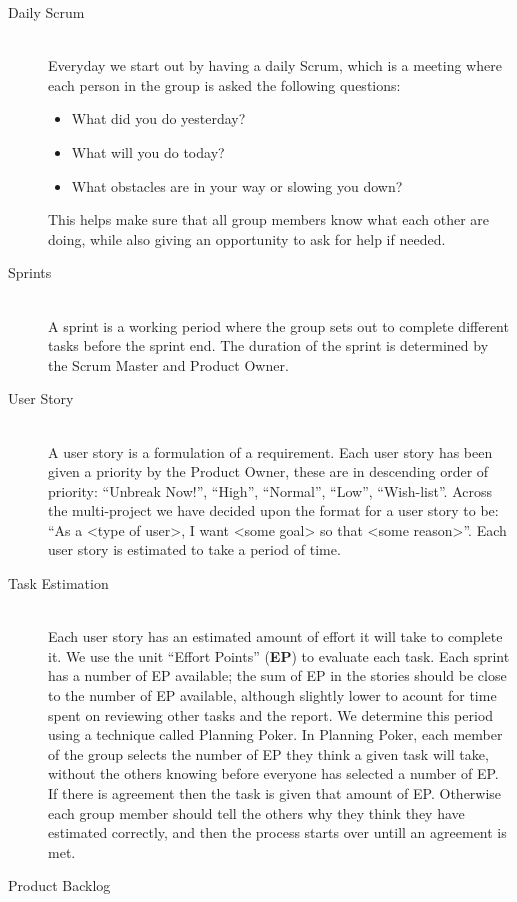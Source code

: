 \begin{description}
	\item[Daily Scrum] \hfill \\
	Everyday we start out by having a daily Scrum, which is a meeting where each person in the group is asked the following questions:
		\begin{itemize}
		    \item What did you do yesterday? 
			\item What will you do today?
			\item What obstacles are in your way or slowing you down?		
		\end{itemize}
		This helps make sure that all group members know what each other are doing, while also giving an opportunity to ask for help if needed.
	\item[Sprints] \hfill \\
	A sprint is a working period where the group sets out to complete different tasks before the sprint end. 
	The duration of the sprint is determined by the Scrum Master and Product Owner. 
	\item[User Story] \hfill \\
	A user story is a formulation of a requirement. 
	Each user story has been given a priority by the Product Owner, these are in descending order of priority: ``Unbreak Now!'', ``High'', ``Normal'', ``Low'', ``Wish-list''. 
	Across the multi-project we have decided upon the format for a user story to be: ``As a <type of user>, I want <some goal> so that <some reason>''.
	Each user story is estimated to take a period of time.
	\item[Task Estimation] \hfill \\
	Each user story has an estimated amount of effort it will take to complete it. 
	We use the unit ``Effort Points'' (\textbf{EP}) to evaluate each task.
	Each sprint has a number of EP available; the sum of EP in the stories should be close to the number of EP available, although slightly lower to acount for time spent on reviewing other tasks and the report. 
	We determine this period using a technique called Planning Poker.
	In Planning Poker, each member of the group selects the number of EP they think a given task will take, without the others knowing before everyone has selected a number of EP.
	If there is agreement then the task is given that amount of EP.
	Otherwise each group member should tell the others why they think they have estimated correctly, and then the process starts over untill an agreement is met.
	\item[Product Backlog] \hfill \\

\end{description}
